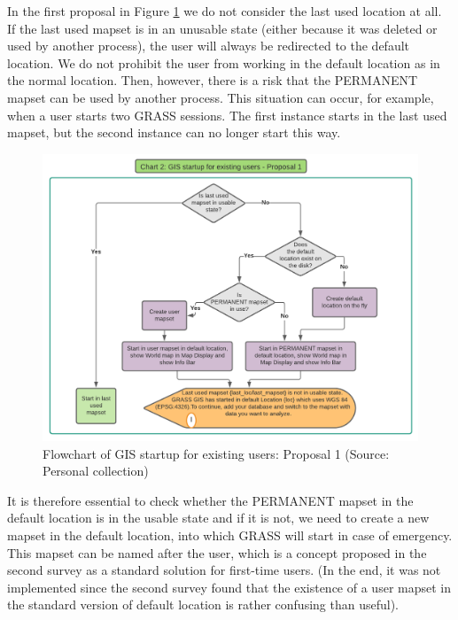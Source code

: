 \documentclass[a4paper,10pt,twoside]{article}
\begin{document}
In the first proposal in Figure \ref{fig:normal_user_diagram} we do not consider the last used location at all. If the last used mapset is in an unusable state (either because it was deleted or used by another process), the user will always be redirected to the default location. We do not prohibit the user from working in the default location as in the normal location. Then, however, there is a risk that the PERMANENT mapset can be used by another process. This situation can occur, for example, when a user starts two GRASS sessions. The first instance starts in the last used mapset, but the second instance can no longer start this way.

\vspace{0.3cm}
\begin{figure}[hbt!] 
\begin{center}
\includegraphics[width=16.5cm]{../pictures/normal_user_diagram.png} 
\caption[Flowchart of GIS startup for existing users: Proposal 1]{Flowchart of GIS startup for existing users: Proposal 1 (Source: Personal collection)}
\label{fig:normal_user_diagram}
\end{center}
\end{figure}

\noindent It is therefore essential to check whether the PERMANENT mapset in the default location is in the usable state and if it is not, we need to create a new mapset in the default location, into which GRASS will start in case of emergency. This mapset can be named after the user, which is a concept proposed in the second survey as a standard solution for first-time users. (In the end, it was not implemented since the second survey found that the existence of a user mapset in the standard version of default location is rather confusing than useful).
\end{document}
